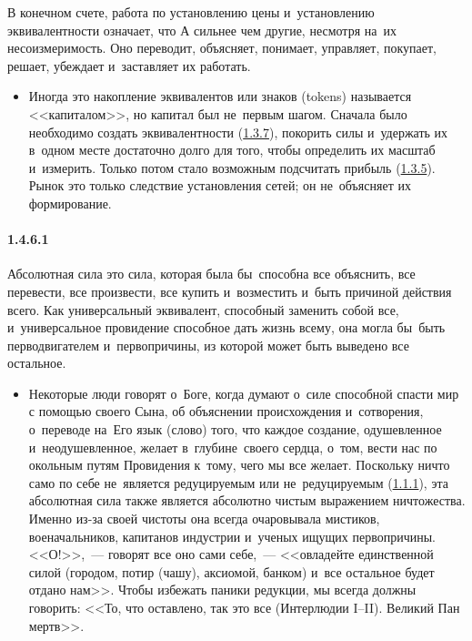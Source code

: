 В конечном счете, работа по установлению цены и~установлению эквивалентности означает, что А сильнее чем другие, несмотря на~их несоизмеримость. Оно переводит, объясняет, понимает, управляет, покупает, решает, убеждает и~заставляет их работать. 
	\begin{itemize}
	\item Иногда это накопление эквивалентов или знаков (tokens) называется <<капиталом>>, но капитал был не~первым шагом. Сначала было необходимо создать эквивалентности (\hyperlink{par:1.3.7}{1.3.7}), покорить силы и~удержать их в~одном месте достаточно долго для того, чтобы определить их масштаб и~измерить. Только потом стало возможным подсчитать прибыль (\hyperlink{par:1.3.5}{1.3.5}). Рынок это только следствие установления сетей; он не~объясняет их формирование.
	\end{itemize}

\paragraph{1.4.6.1}\hypertarget{par:1.4.6.1}{} Абсолютная сила это сила, которая была бы~способна все объяснить, все перевести, все произвести, все купить и~возместить и~быть причиной действия всего. Как универсальный эквивалент, способный заменить собой все, и~универсальное провидение способное дать жизнь всему, она могла бы~быть перводвигателем и~первопричины, из которой может быть выведено все остальное. 
	\begin{itemize}
	\item Некоторые люди говорят о~Боге, когда думают о~силе способной спасти мир с помощью своего Сына, об объяснении происхождения и~сотворения, о~переводе на~Его язык (слово) того, что каждое создание, одушевленное и~неодушевленное, желает в~глубине~своего сердца, о~том, вести нас по окольным путям Провидения к~тому, чего мы все желает. Поскольку ничто само по себе не~является редуцируемым или не~редуцируемым (\hyperlink{par:1.1.1}{1.1.1}), эта абсолютная сила также является абсолютно чистым выражением ничтожества. Именно из-за своей чистоты она всегда очаровывала мистиков, военачальников, капитанов индустрии и~ученых ищущих первопричины. <<О!>>,~--- говорят все оно сами себе,~--- <<овладейте единственной силой (городом, потир (чашу), аксиомой, банком) и~все остальное будет отдано нам>>. Чтобы избежать паники редукции, мы всегда должны говорить: <<То, что оставлено, так это все (Интерлюдии I--II). Великий Пан мертв>>.
	\end{itemize}

